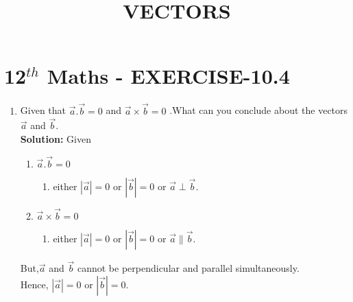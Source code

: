 \documentclass[10pt]{article}
\newcommand{\solution}{\noindent \textbf{Solution: }}
\providecommand{\abs}[1]{\left\vert#1\right\vert}
\begin{document}
\begin{center}
\title{\textbf{VECTORS}}
\date{\vspace{-5ex}} %
\maketitle
\end{center}

\section{12$^{th}$ Maths - EXERCISE-10.4}

\begin{enumerate}
\item Given that $\overrightarrow{a}.\overrightarrow{b}=0$ and $\overrightarrow{a}\times\overrightarrow{b}=0$ .What can you conclude about the vectors $\overrightarrow{a}$ and $\overrightarrow{b}$.\\  

\solution
Given  

\begin{enumerate}
\item $\overrightarrow{a}.\overrightarrow{b}=0$
\begin{enumerate}
\item either $\abs{\overrightarrow{a}}=0$ or $\abs{\overrightarrow{b}}=0$ or $\overrightarrow{a}\perp\overrightarrow{b}$.
\end{enumerate}
\item $\overrightarrow{a}\times\overrightarrow{b}=0$
\begin{enumerate}
\item either $\abs{\overrightarrow{a}}=0$ or $\abs{\overrightarrow{b}}=0$ or  $\overrightarrow{a}\parallel\overrightarrow{b}$.
\end{enumerate}
\end{enumerate}
But,$\overrightarrow{a}$ and $\overrightarrow{b}$ cannot be perpendicular and parallel simultaneously.\\
Hence, $\abs{\overrightarrow{a}}=0$ or $\abs{\overrightarrow{b}}=0$.

\end{enumerate}
\end{document}
